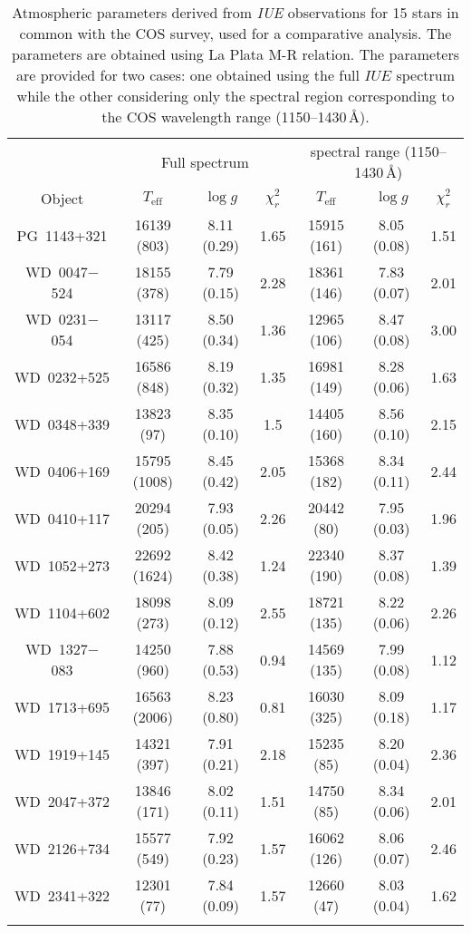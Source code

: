 \documentclass[fleqn,usenatbib, useAMS]{mnras}
\newcommand{\Teff}{\mbox{$T_{\mathrm{eff}}$}}
\newcommand{\logg}{\mbox{$\log g$}}
\begin{document}
\begin{table*}
\centering
\caption{Atmospheric parameters derived from \textit{IUE} observations for 15 stars in common with the COS survey, used for a comparative analysis. The parameters are obtained using La Plata M-R relation. The parameters are provided for two cases: one obtained using the full $IUE$ spectrum while the other considering only the spectral region corresponding to the COS wavelength range (1150--1430\,\AA).}
\begin{tabular}{ccccccc} \hline
& \multicolumn{3}{c}{Full spectrum} & \multicolumn{3}{c}{spectral range (1150--1430\,\AA)} \\
Object	& 	\Teff	&	\logg	&	$\chi_r^2$ 	&	\Teff	&	\logg & $\chi_r^2$ 	\\\hline
PG\ 1143+321	&	16139	(803)	&	8.11	(0.29)	&	1.65	&	15915	(161)	&	8.05	(0.08)	&	1.51	\\
WD\ 0047$-$524	&	18155	(378)	&	7.79	(0.15)	&	2.28	&	18361	(146)	&	7.83	(0.07)	&	2.01	\\
WD\ 0231$-$054	&	13117	(425)	&	8.50	(0.34)	&	1.36	&	12965	(106)	&	8.47	(0.08)	&	3.00	\\
WD\ 0232+525	&	16586	(848)	&	8.19	(0.32)	&	1.35	&	16981	(149)	&	8.28	(0.06)	&	1.63	\\
WD\ 0348+339	&	13823	(97)	&	8.35	(0.10)	&	1.5	&	14405	(160)	&	8.56	(0.10)	&	2.15	\\
WD\ 0406+169	&	15795	(1008)	&	8.45	(0.42)	&	2.05	&	15368	(182)	&	8.34	(0.11)	&	2.44	\\
WD\ 0410+117	&	20294	(205)	&	7.93	(0.05)	&	2.26	&	20442	(80)	&	7.95	(0.03)	&	1.96	\\
WD\ 1052+273	&	22692	(1624)	&	8.42	(0.38)	&	1.24	&	22340	(190)	&	8.37	(0.08)	&	1.39	\\
WD\ 1104+602	&	18098	(273)	&	8.09	(0.12)	&	2.55	&	18721	(135)	&	8.22	(0.06)	&	2.26	\\
WD\ 1327$-$083	&	14250	(960)	&	7.88	(0.53)	&	0.94	&	14569	(135)	&	7.99	(0.08)	&	1.12	\\
WD\ 1713+695	&	16563	(2006)	&	8.23	(0.80)	&	0.81	&	16030	(325)	&	8.09	(0.18)	&	1.17	\\
WD\ 1919+145	&	14321	(397)	&	7.91	(0.21)	&	2.18	&	15235	(85)	&	8.20	(0.04)	&	2.36	\\
WD\ 2047+372	&	13846	(171)	&	8.02	(0.11)	&	1.51	&	14750	(85)	&	8.34	(0.06)	&	2.01	\\
WD\ 2126+734	&	15577	(549)	&	7.92	(0.23)	&	1.57	&	16062	(126)	&	8.06	(0.07)	&	2.46	\\
WD\ 2341+322	&	12301	(77)	&	7.84	(0.09)	&	1.57	&	12660	(47)	&	8.03	(0.04)	&	1.62	\\

\hline
\label{tab:iue_params}
\end{tabular}
\end{table*}
\end{document}
